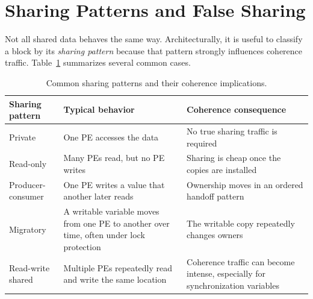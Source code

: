 \section{Sharing Patterns and False Sharing}\label{sec:mp-false-sharing}
Not all shared data behaves the same way.
Architecturally, it is useful to classify a block by its \textit{sharing pattern} because that pattern strongly influences coherence traffic.
Table~\ref{tab:mp-sharing-patterns} summarizes several common cases.
\begin{table}[t]
    \centering
    \small
    \renewcommand{\arraystretch}{1.15}
    \begin{tabular}{|>{\raggedright\arraybackslash}p{1.25in}|>{\raggedright\arraybackslash}p{1.65in}|>{\raggedright\arraybackslash}p{2.45in}|}
        \hline
        Sharing pattern   & Typical behavior                                                                        & Coherence consequence                                                          \\
        \hline
        Private           & One PE accesses the data                                                                & No true sharing traffic is required                                            \\
        \hline
        Read-only         & Many PEs read, but no PE writes                                                         & Sharing is cheap once the copies are installed                                 \\
        \hline
        Producer-consumer & One PE writes a value that another later reads                                          & Ownership moves in an ordered handoff pattern                                  \\
        \hline
        Migratory         & A writable variable moves from one PE to another over time, often under lock protection & The writable copy repeatedly changes owners \\
        \hline
        Read-write shared & Multiple PEs repeatedly read and write the same location                                & Coherence traffic can become intense, especially for synchronization variables \\
        \hline
    \end{tabular}
    \caption{Common sharing patterns and their coherence implications.}
    \label{tab:mp-sharing-patterns}
\end{table}

